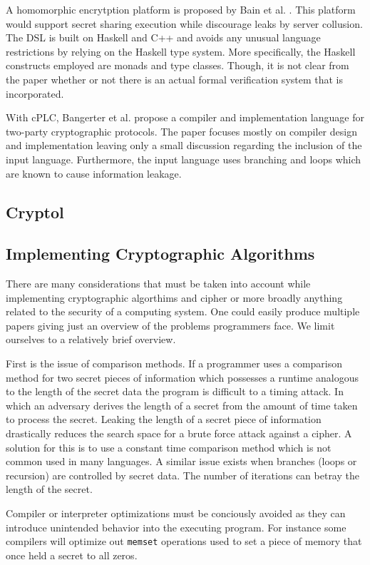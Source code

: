 A homomorphic encrytption platform is proposed by Bain et al. \cite{Bain}. This platform would support secret sharing execution while discourage leaks by server collusion. The DSL is built on Haskell and C++ and avoids any unusual language restrictions by relying on the Haskell type system. More specifically, the Haskell constructs employed are monads and type classes. Though, it is not clear from the paper whether or not there is an actual formal verification system that is incorporated.  

With cPLC, Bangerter et al. \cite{Bangerter} propose a compiler and implementation language for two-party cryptographic protocols. The paper focuses mostly on compiler design and implementation leaving only a small discussion regarding the inclusion of the input language. Furthermore, the input language uses branching and loops which are known to cause information leakage. 


\subsection{Cryptol}

\subsection{Implementing Cryptographic Algorithms}
There are many considerations that must be taken into account while implementing cryptographic algorthims and cipher or more broadly anything related to the security of 
a computing system\cite{CryptoCoding}. One could easily produce multiple papers giving just an overview of the problems programmers face. We limit ourselves to a relatively brief overview.

First is the issue of comparison methods. If a programmer uses a comparison method for two secret pieces of information which possesses a runtime analogous to the length 
of the secret data the program is difficult to a timing attack. In which an adversary derives the length of a secret from the amount of time taken to process the secret. 
Leaking the length of a secret piece of information drastically reduces the search space for a brute force attack against a cipher. A solution for this is to use a 
constant time comparison method which is not common used in many languages. A similar issue exists when branches (loops or recursion) are controlled by secret data. The 
number of iterations can betray the length of the secret.

Compiler or interpreter optimizations must be conciously avoided as they can introduce unintended behavior into the executing program. For instance some compilers will 
optimize out \texttt{memset} operations used to set a piece of memory that once held a secret to all zeros.

